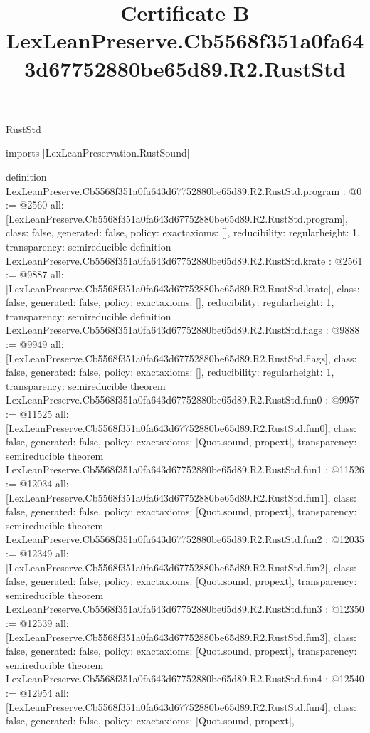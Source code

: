 \begin{lexlean}{RustStd}
\title{Certificate B LexLeanPreserve.Cb5568f351a0fa643d67752880be65d89.R2.RustStd}
\begin{coremodule}
imports [LexLeanPreservation.RustSound]

definition LexLeanPreserve.Cb5568f351a0fa643d67752880be65d89.R2.RustStd.program : @0 := @2560 {
  all: [LexLeanPreserve.Cb5568f351a0fa643d67752880be65d89.R2.RustStd.program],
  class: false,
  generated: false,
  policy: exact{axioms: []},
  reducibility: regular{height: 1},
  transparency: semireducible
}
definition LexLeanPreserve.Cb5568f351a0fa643d67752880be65d89.R2.RustStd.krate : @2561 := @9887 {
  all: [LexLeanPreserve.Cb5568f351a0fa643d67752880be65d89.R2.RustStd.krate],
  class: false,
  generated: false,
  policy: exact{axioms: []},
  reducibility: regular{height: 1},
  transparency: semireducible
}
definition LexLeanPreserve.Cb5568f351a0fa643d67752880be65d89.R2.RustStd.flags : @9888 := @9949 {
  all: [LexLeanPreserve.Cb5568f351a0fa643d67752880be65d89.R2.RustStd.flags],
  class: false,
  generated: false,
  policy: exact{axioms: []},
  reducibility: regular{height: 1},
  transparency: semireducible
}
theorem LexLeanPreserve.Cb5568f351a0fa643d67752880be65d89.R2.RustStd.fun0 : @9957 := @11525 {
  all: [LexLeanPreserve.Cb5568f351a0fa643d67752880be65d89.R2.RustStd.fun0],
  class: false,
  generated: false,
  policy: exact{axioms: [Quot.sound, propext]},
  transparency: semireducible
}
theorem LexLeanPreserve.Cb5568f351a0fa643d67752880be65d89.R2.RustStd.fun1 : @11526 := @12034 {
  all: [LexLeanPreserve.Cb5568f351a0fa643d67752880be65d89.R2.RustStd.fun1],
  class: false,
  generated: false,
  policy: exact{axioms: [Quot.sound, propext]},
  transparency: semireducible
}
theorem LexLeanPreserve.Cb5568f351a0fa643d67752880be65d89.R2.RustStd.fun2 : @12035 := @12349 {
  all: [LexLeanPreserve.Cb5568f351a0fa643d67752880be65d89.R2.RustStd.fun2],
  class: false,
  generated: false,
  policy: exact{axioms: [Quot.sound, propext]},
  transparency: semireducible
}
theorem LexLeanPreserve.Cb5568f351a0fa643d67752880be65d89.R2.RustStd.fun3 : @12350 := @12539 {
  all: [LexLeanPreserve.Cb5568f351a0fa643d67752880be65d89.R2.RustStd.fun3],
  class: false,
  generated: false,
  policy: exact{axioms: [Quot.sound, propext]},
  transparency: semireducible
}
theorem LexLeanPreserve.Cb5568f351a0fa643d67752880be65d89.R2.RustStd.fun4 : @12540 := @12954 {
  all: [LexLeanPreserve.Cb5568f351a0fa643d67752880be65d89.R2.RustStd.fun4],
  class: false,
  generated: false,
  policy: exact{axioms: [Quot.sound, propext]},
}
\end{coremodule}
\end{lexlean}

